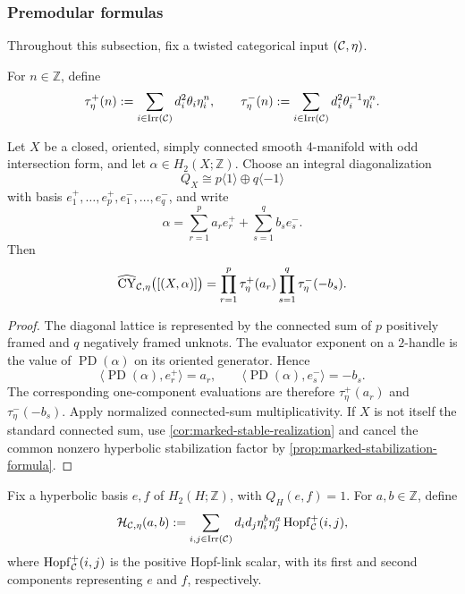 \subsubsection{Premodular formulas}
\label{subsec:premodular-formulas}

Throughout this subsection, fix a twisted categorical input \((\mathcal{C},\eta)\).

\begin{definition}
\label{def:shifted-gauss-sums}
For $n\in\mathbb Z$, define
\[
  \tau_\eta^+(n)
  :=\sum_{i\in\operatorname{Irr}(\mathcal{C})}d_i^2\theta_i\eta_i^n,
  \qquad
  \tau_\eta^-(n)
  :=\sum_{i\in\operatorname{Irr}(\mathcal{C})}d_i^2\theta_i^{-1}\eta_i^n.
\]
\end{definition}

\begin{proposition}
\label{prop:odd-formula}
Let $X$ be a closed, oriented, simply connected smooth 4-manifold with
odd intersection form, and let \(\alpha\in H_2(X;\mathbb Z)\).  Choose an
integral diagonalization
\[
  Q_X\cong p\langle1\rangle\oplus q\langle-1\rangle
\]
with basis $e_1^+,\ldots,e_p^+,e_1^-,\ldots,e_q^-$, and write
\[
  \alpha=\sum_{r=1}^p a_re_r^++\sum_{s=1}^q b_se_s^-.
\]
Then
\[
  \widehat{\operatorname{CY}}_{\mathcal{C},\eta}\bigl([(X,\alpha)]\bigr)
  =\prod_{r=1}^{p}\tau_\eta^+(a_r)
   \prod_{s=1}^{q}\tau_\eta^-(-b_s).
\]
\end{proposition}

\begin{proof}
The diagonal lattice is represented by the connected sum of $p$ positively
framed and $q$ negatively framed unknots.  The evaluator exponent on a
$2$-handle is the value of $\operatorname{PD}(\alpha)$ on its oriented
generator.  Hence
\[
  \langle\operatorname{PD}(\alpha),e_r^+\rangle=a_r,
  \qquad
  \langle\operatorname{PD}(\alpha),e_s^-\rangle=-b_s.
\]
The corresponding one-component evaluations are therefore
$\tau_\eta^+(a_r)$ and $\tau_\eta^-(-b_s)$.  Apply normalized connected-sum
multiplicativity.  If $X$ is not itself the standard connected sum, use
\cref{cor:marked-stable-realization} and cancel the common nonzero
hyperbolic stabilization factor by
\cref{prop:marked-stabilization-formula}.
\end{proof}

\begin{definition}
\label{def:hyperbolic-block-value}
Fix a hyperbolic basis $e,f$ of $H_2(H;\mathbb Z)$, with
$Q_H(e,f)=1$.  For \(a,b\in\mathbb Z\), define
\[
  \mathcal H_{\mathcal{C},\eta}(a,b)
  :=\sum_{i,j\in\operatorname{Irr}(\mathcal{C})}
       d_i d_j\eta_i^b\eta_j^a
       \operatorname{Hopf}_{\mathcal{C}}^{+}(i,j),
\]
where $\operatorname{Hopf}_{\mathcal{C}}^{+}(i,j)$ is the positive Hopf-link
scalar, with its first and second components representing $e$ and $f$,
respectively.
\end{definition}

